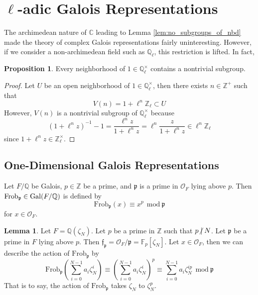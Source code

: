 \documentclass[12pt]{article}
\newcommand{\ndivides}{\centernot \mid}
\newcommand{\Z}{\mathbb{Z}}
\newcommand{\C}{\mathbb{C}}
\newcommand{\Q}{\mathbb{Q}}
\newcommand{\finfield}[1]{\mathbb{F}_{#1}}
\newcommand{\Gal}[1]{\mathrm{Gal} \small(#1 \small)}
\newcommand{\ints}[1]{\mathcal{O}_{#1}}
\newcommand{\Frob}[0]{\mathrm{Frob}}
\newcommand{\Frobp}{\Frob_{\mathfrak{p}}}
\theoremstyle{remark}
\theoremstyle{definition}
\newtheorem{lemma}[theorem]{Lemma}
\newtheorem{proposition}[theorem]{Proposition}
\newenvironment{definition}[1][Definition:]{\begin{trivlist}
\item[\hskip \labelsep {\bfseries #1}]}{\end{trivlist}}
\begin{document}
\section{$\ell$-adic Galois Representations}

The archimedean nature of $\C$ leading to Lemma \ref{lem:no_subgroups_of_nbd} made the theory of complex Galois representations fairly uninteresting. However, if we consider a non-archimedean field such as $\Q_{\ell}$, this restriction is lifted. In fact,

\begin{proposition}
Every neighborhood of $1 \in \Q_{\ell}^\times$ contains a nontrivial subgroup.
\end{proposition}
\begin{proof}
Let $U$ be an open neighborhood of $1 \in \Q_{\ell}^\times$, then there exists $n \in \Z^+$ such that \[V(n) = 1 + \ell^n \Z_{\ell} \subset U\] 
However, $V(n)$ is a nontrivial subgroup of $\Q_{\ell}^\times$ because 
\[(1 + \ell^n z)^{-1} - 1 = \frac{ \ell^n z }{1 + \ell^n z} = \ell^n \frac{z}{1 + \ell^n z} \in \ell^n \Z_{\ell} \]
since $1 + \ell^n z \in \Z_{\ell}^\times$. 
\end{proof}

\subsection{One-Dimensional Galois Representations}

\begin{definition}
Let $F/\Q$ be Galois, $p \in \Z$ be a prime, and $\mathfrak{p}$ is a prime in $\ints{F}$ lying above $p$. Then $\Frobp \in \Gal{F/\Q}$ is defined by 
\[ \Frobp(x) \equiv x^p  \: \: \mathrm{mod} \:  \mathfrak{p} \] for $x \in \ints{F}$.
\end{definition}

\begin{lemma}
Let $F = \Q(\zeta_N)$. Let $p$ be a prime in $\Z$ such that $p \ndivides N$. Let $\mathfrak{p}$ be a prime in $F$ lying above $p$. Then $\mathfrak{f}_{\mathfrak{p}} = \ints{F} / \mathfrak{p} = \finfield{p}[\zeta_N]$. 
Let $x \in \ints{F}$, then we can describe the action of $\Frobp$ by 
\[ \Frobp\left( \sum_{i = 0}^{N-1} a_i \zeta_N^i \right) \equiv \left( \sum_{i = 0}^{N-1} a_i \zeta_N^i \right)^p \equiv \sum_{i = 0}^{N-1} a_i \zeta_N^{ip} \: \: \mathrm{mod} \: \mathfrak{p} \]
That is to say, the action of $\Frobp$ takes $\zeta_N$ to $\zeta_N^p$.
\end{lemma}
\end{document}
